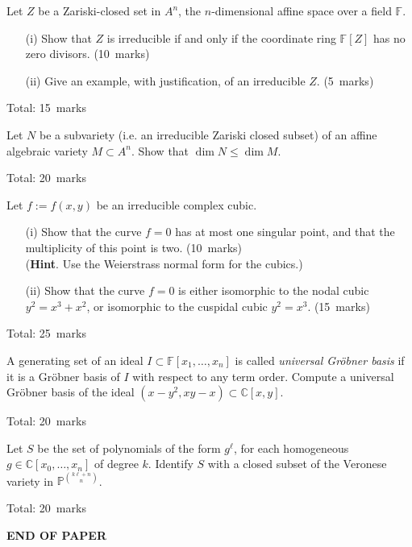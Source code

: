 \documentclass[12pt]{article}
\newcommand{\F}{\mathbb{F}}
\newcommand{\C}{\mathbb{C}}
\newcommand{\PP}{\mathbb{P}}
\begin{document}
Let $Z$ be a Zariski-closed set in $A^n$, the $n$-dimensional affine space over a
field $\F$. 
\begin{itemize}
\item[(i)] 
Show that $Z$ is irreducible if and only if the coordinate ring $\F[Z]$ has no
zero divisors. \hfill (10~marks)
\item[(ii)] 
Give an example, with justification, of an irreducible $Z$.
 \hfill (5~marks)
\end{itemize}

\hspace*{2cm} \hfill Total: 15~marks
\bigskip
\bigskip
\bigskip
\bigskip

Let $N$ be a subvariety (i.e. an irreducible Zariski closed subset) 
of an affine algebraic variety $M\subset A^n$.
Show that $\dim N\leq \dim M$.

\hspace*{2cm} \hfill Total: 20~marks
\bigskip
\bigskip
\bigskip
\bigskip

Let $f:=f(x,y)$ be an irreducible complex cubic. 
\begin{itemize}
\item[(i)] 
Show that the curve $f=0$ has at most one singular point, 
and that the multiplicity of this point is two.
\hfill (10~marks)
\\
({\bf Hint}. Use the Weierstrass normal form for the cubics.)
\item[(ii)] 
Show that the curve $f=0$ is either isomorphic to the nodal cubic $y^2=x^3+x^2$, or 
isomorphic to the cuspidal cubic $y^2=x^3$.
 \hfill (15~marks)
\end{itemize}

\hspace*{2cm} 
\hfill Total: 25~marks
\bigskip
\bigskip
\bigskip
\newpage

A generating set of an ideal $I\subset\F[x_1,\dots,x_n]$ is called \emph{universal Gr\"{o}bner basis}
if it is a  Gr\"{o}bner basis of $I$ with respect to any term order. 
Compute a universal Gr\"{o}bner basis of the ideal $(x-y^2,xy-x)\subset\C[x,y]$.

 \hfill Total: 20~marks
\bigskip
\bigskip
\bigskip

Let $S$ be the set of polynomials of the form $g^\ell$, for each 
homogeneous $g\in\C[x_0,\dots,x_n]$ of degree $k$. Identify $S$ with a closed subset
of the Veronese variety in $\PP^{\binom{k\ell+n}{n}}$.

\hspace*{2cm} 
\hfill Total: 20~marks



\vfill
\centerline{\bf END OF PAPER}
\end{document}
